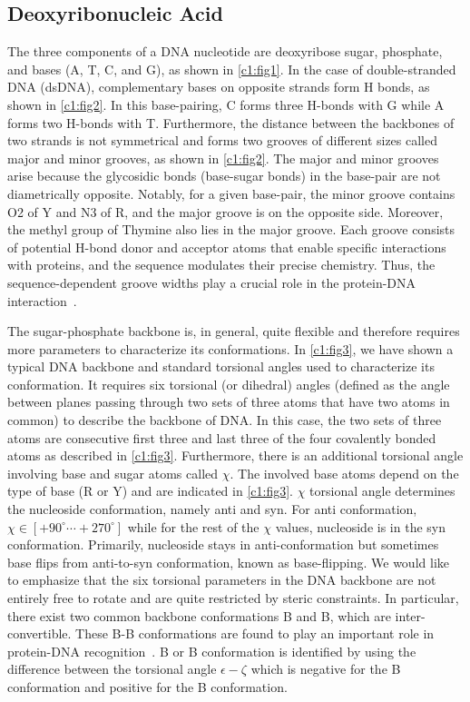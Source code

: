 \subsection{Deoxyribonucleic Acid}\label{c1:s2:sb1}



The three components of a DNA nucleotide are deoxyribose sugar, phosphate, and bases (A, T, C, and G), as shown in \cref{c1:fig1}.
In the case of double-stranded DNA (dsDNA), complementary bases on opposite strands form H bonds, as shown in \cref{c1:fig2}.
In this base-pairing, C forms three H-bonds with G while A forms two H-bonds with T.
Furthermore, the distance between the backbones of two strands is not symmetrical and forms two grooves of different sizes called major and minor grooves, as shown in \cref{c1:fig2}.
The major and minor grooves arise because the glycosidic bonds (base-sugar bonds) in the base-pair are not diametrically opposite. 
Notably, for a given base-pair, the minor groove contains O2 of Y and N3 of R, and the major groove is on the opposite side.
Moreover, the methyl group of Thymine also lies in the major groove.
Each groove consists of potential H-bond donor and acceptor atoms that enable specific interactions with proteins, and the sequence modulates their precise chemistry. 
Thus, the sequence-dependent groove widths play a crucial role in the protein-DNA interaction~\cite{rohs2010origins,rohs2009role,oguey2010understanding,stofer1994measuring}. 

The sugar-phosphate backbone is, in general, quite flexible and therefore requires more parameters to characterize its conformations.
In \cref{c1:fig3}, we have shown a typical DNA backbone and standard torsional angles used to characterize its conformation.
It requires six torsional (or dihedral) angles (defined as the angle between planes passing through two sets of three atoms that have two atoms in common) to describe the backbone of DNA. 
In this case, the two sets of three atoms are consecutive first three and last three of the four covalently bonded atoms as described in \cref{c1:fig3}. 
Furthermore, there is an additional torsional angle involving base and sugar atoms called $\chi$. 
The involved base atoms depend on the type of base (R or Y) and are indicated in \cref{c1:fig3}.
$\chi$ torsional angle determines the nucleoside conformation, namely anti and syn. 
For anti conformation, $\chi \in [+90^\circ \cdots +270^\circ]$ while for the rest of the $\chi$ values, nucleoside is in the syn conformation. 
Primarily, nucleoside stays in anti-conformation but sometimes base flips from anti-to-syn conformation, known as base-flipping.
We would like to emphasize that the six torsional parameters in the DNA backbone are not entirely free to rotate and are quite restricted by steric constraints.
In particular, there exist two common backbone conformations B and B, which are inter-convertible. 
These B-B conformations are found to play an important role in protein-DNA recognition~\cite{gorenstein1994conformation}.
B or B conformation is identified by using the difference between the torsional angle $\epsilon-\zeta$ which is negative for the B conformation and positive for the B conformation.

